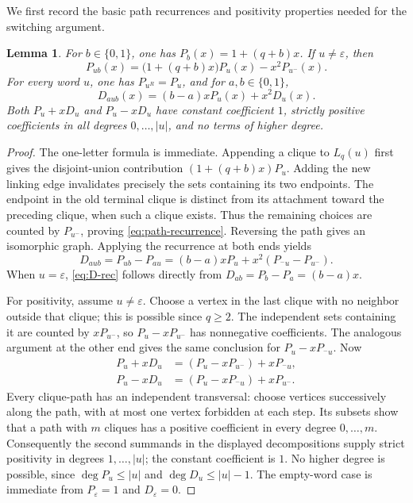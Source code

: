 \documentclass[11pt]{article}
\newtheorem{lemma}[lemma]{Lemma}
\theoremstyle{definition}
\begin{document}
We first record the basic path recurrences and positivity properties
needed for the switching argument.
\begin{lemma}
\label{lem:path-facts}
For $b\in\{0,1\}$, one has $P_b(x)=1+(q+b)x$. If $u\ne\varepsilon$,
then
\begin{equation}\label{eq:path-recurrence}
 P_{ub}(x)=\bigl(1+(q+b)x\bigr)P_u(x)-x^2P_{u^-}(x).
\end{equation}
For every word $u$, one has $P_{u^R}=P_u$, and for
$a,b\in\{0,1\}$,
\begin{equation}\label{eq:D-rec}
 D_{aub}(x)=(b-a)xP_u(x)+x^2D_u(x).
\end{equation}
Both $P_u+xD_u$ and $P_u-xD_u$ have constant coefficient $1$,
strictly positive coefficients in all degrees $0,\ldots,|u|$, and
no terms of higher degree.
\end{lemma}

\begin{proof}
The one-letter formula is immediate. Appending a clique to $L_q(u)$
first gives the disjoint-union contribution
$(1+(q+b)x)P_u$. Adding the new linking edge invalidates precisely
the sets containing its two endpoints. The endpoint in the old
terminal clique is distinct from its attachment toward the preceding
clique, when such a clique exists. Thus the remaining choices are
counted by $P_{u^-}$, proving \eqref{eq:path-recurrence}.
Reversing the path gives an isomorphic graph. Applying the recurrence
at both ends yields
\[
 D_{aub}=P_{ub}-P_{au}
        =(b-a)xP_u+x^2(P_{{}^-u}-P_{u^-}).
\]
When $u=\varepsilon$, \eqref{eq:D-rec} follows directly from
$D_{ab}=P_b-P_a=(b-a)x$.

For positivity, assume $u\ne\varepsilon$. Choose a vertex in the last
clique with no neighbor outside that clique; this is possible since
$q\ge2$. The independent sets containing it are counted by
$xP_{u^-}$, so $P_u-xP_{u^-}$ has nonnegative coefficients.
The analogous argument at the other end gives the same conclusion
for $P_u-xP_{{}^-u}$. Now
\[
 \begin{aligned}
 P_u+xD_u&=(P_u-xP_{u^-})+xP_{{}^-u},\\
 P_u-xD_u&=(P_u-xP_{{}^-u})+xP_{u^-}.
 \end{aligned}
\]
Every clique-path has an independent transversal: choose vertices
successively along the path, with at most one vertex forbidden at
each step. Its subsets show that a path with $m$ cliques has a
positive coefficient in every degree $0,\ldots,m$.
Consequently the second summands in the displayed decompositions
supply strict positivity in degrees $1,\ldots,|u|$; the constant
coefficient is $1$. No higher degree is possible, since
$\deg P_u\le |u|$ and $\deg D_u\le |u|-1$.
The empty-word case is immediate from
$P_\varepsilon=1$ and $D_\varepsilon=0$.
\end{proof}
\end{document}
